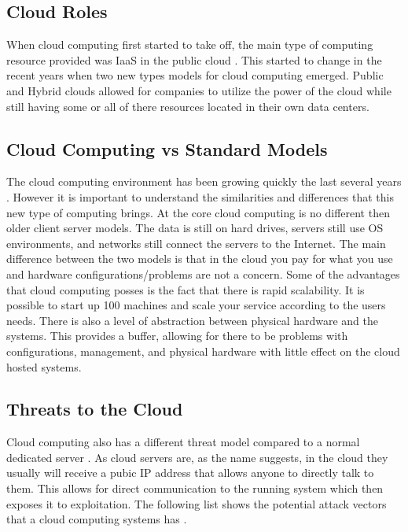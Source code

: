 \documentclass[12pt]{article}
\begin{document}
\subsection{Cloud Roles}
When cloud computing first started to take off, the main type of computing resource provided was IaaS in the public cloud \cite{sourcedigit}. This started to change in the recent years when two new types models for cloud computing emerged. Public and Hybrid clouds allowed for companies to utilize the power of the cloud while still having some or all of there resources located in their own data centers.

\subsection{Cloud Computing vs Standard Models}
The cloud computing environment has been growing quickly the last several years \cite{Vaquero}. However it is important to understand the similarities and differences that this new type of computing brings. At the core cloud computing is no different then older client server models. The data is still on hard drives, servers still use OS environments, and networks still connect the servers to the Internet. The main difference between the two models is that in the cloud you pay for what you use and hardware configurations/problems are not a concern. Some of the advantages that cloud computing posses is the fact that there is rapid scalability. It is possible to start up 100 machines and scale your service according to the users needs. There is also a level of abstraction between physical hardware and the systems. This provides a buffer, allowing for there to be problems with configurations, management, and physical hardware with little effect on the cloud hosted systems.

\subsection{Threats to the Cloud}
Cloud computing also has a different threat model compared to a normal dedicated server \cite{zissis2012addressing, mishra2013cloud, krutz2010cloud}. As cloud servers are, as the name suggests, in the cloud they usually will receive a pubic IP address that allows anyone to directly talk to them. This allows for direct communication to the running system which then exposes it to exploitation. The following list shows the potential attack vectors that a cloud computing systems has \cite{amini2015threat}.
\end{document}
